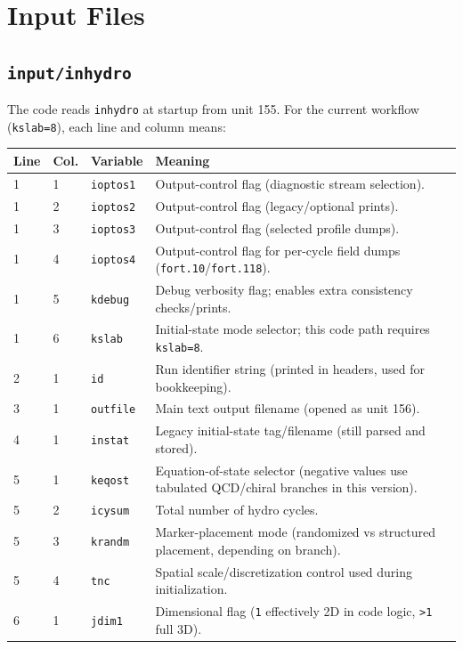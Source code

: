 \documentclass[11pt,a4paper]{article}
\begin{document}
\section{Input Files}
\subsection{\texttt{input/inhydro}}
The code reads \texttt{inhydro} at startup from unit 155. For the current
workflow (\texttt{kslab=8}), each line and column means:

\begin{longtable}{|p{1.2cm}|p{1.0cm}|p{3.0cm}|p{6.5cm}|}
\hline
Line & Col. & Variable & Meaning \\\hline
1 & 1 & \texttt{ioptos1} & Output-control flag (diagnostic stream selection). \\\hline
1 & 2 & \texttt{ioptos2} & Output-control flag (legacy/optional prints). \\\hline
1 & 3 & \texttt{ioptos3} & Output-control flag (selected profile dumps). \\\hline
1 & 4 & \texttt{ioptos4} & Output-control flag for per-cycle field dumps (\texttt{fort.10}/\texttt{fort.118}). \\\hline
1 & 5 & \texttt{kdebug} & Debug verbosity flag; enables extra consistency checks/prints. \\\hline
1 & 6 & \texttt{kslab} & Initial-state mode selector; this code path requires \texttt{kslab=8}. \\\hline
2 & 1 & \texttt{id} & Run identifier string (printed in headers, used for bookkeeping). \\\hline
3 & 1 & \texttt{outfile} & Main text output filename (opened as unit 156). \\\hline
4 & 1 & \texttt{instat} & Legacy initial-state tag/filename (still parsed and stored). \\\hline
5 & 1 & \texttt{keqost} & Equation-of-state selector (negative values use tabulated QCD/chiral branches in this version). \\\hline
5 & 2 & \texttt{icysum} & Total number of hydro cycles. \\\hline
5 & 3 & \texttt{krandm} & Marker-placement mode (randomized vs structured placement, depending on branch). \\\hline
5 & 4 & \texttt{tnc} & Spatial scale/discretization control used during initialization. \\\hline
6 & 1 & \texttt{jdim1} & Dimensional flag (\texttt{1} effectively 2D in code logic, \texttt{>1} full 3D). \\\hline

\end{longtable}
\end{document}
